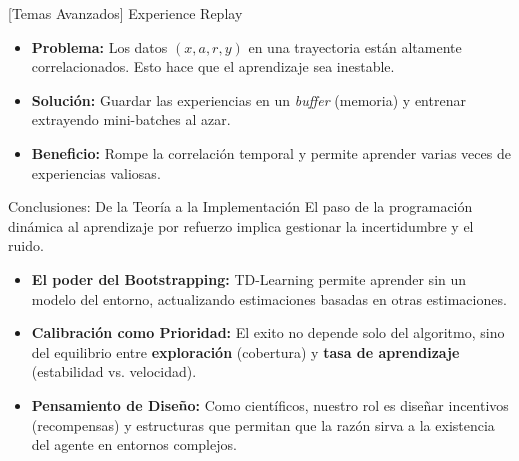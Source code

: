 \documentclass[xcolor=dvipsnames, handout]{beamer}
\begin{document}
\begin{frame}{[Temas Avanzados] Experience Replay}
\begin{itemize}
    \item \textbf{Problema:} Los datos $(x, a, r, y)$ en una trayectoria est\'an altamente correlacionados. Esto hace que el aprendizaje sea inestable.
    \item \textbf{Soluci\'on:} Guardar las experiencias en un \textit{buffer} (memoria) y entrenar extrayendo mini-batches al azar.
    \item \textbf{Beneficio:} Rompe la correlaci\'on temporal y permite aprender varias veces de experiencias valiosas.
\end{itemize}
\end{frame}

\begin{frame}{Conclusiones: De la Teor\'ia a la Implementaci\'on}
El paso de la programaci\'on din\'amica al aprendizaje por refuerzo implica gestionar la incertidumbre y el ruido.

\begin{itemize}
    \item \textbf{El poder del Bootstrapping:} TD-Learning permite aprender sin un modelo del entorno, actualizando estimaciones basadas en otras estimaciones.
    
    \item \textbf{Calibraci\'on como Prioridad:} El exito no depende solo del algoritmo, sino del equilibrio entre \textbf{exploraci\'on} (cobertura) y \textbf{tasa de aprendizaje} (estabilidad vs. velocidad).


    \item \textbf{Pensamiento de Diseño:} Como cient\'ificos, nuestro rol es dise\~nar incentivos (recompensas) y estructuras que permitan que la raz\'on sirva a la existencia del agente en entornos complejos.
\end{itemize}

\end{frame}
\end{document}
